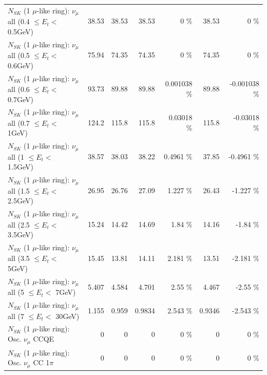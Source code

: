 \begin{table}
\begin{tabular}{| l | r | r | r  r | r  r |}
       $N_{SK}$ (1 $\mu$-like ring): $\nu_{\mu}$ all (0.4 $\leq E_{t} <$ 0.5GeV) &           38.53 &           38.53 &           38.53 &        0 \%  &           38.53 &        0 \%  \\ 
       $N_{SK}$ (1 $\mu$-like ring): $\nu_{\mu}$ all (0.5 $\leq E_{t} <$ 0.6GeV) &           75.94 &           74.35 &           74.35 &        0 \%  &           74.35 &        0 \%  \\ 
       $N_{SK}$ (1 $\mu$-like ring): $\nu_{\mu}$ all (0.6 $\leq E_{t} <$ 0.7GeV) &           93.73 &           89.88 &           89.88 & 0.001038 \%  &           89.88 & -0.001038 \%  \\ 
         $N_{SK}$ (1 $\mu$-like ring): $\nu_{\mu}$ all (0.7 $\leq E_{t} <$ 1GeV) &           124.2 &           115.8 &           115.8 &  0.03018 \%  &           115.8 & -0.03018 \%  \\ 
         $N_{SK}$ (1 $\mu$-like ring): $\nu_{\mu}$ all (1 $\leq E_{t} <$ 1.5GeV) &           38.57 &           38.03 &           38.22 &   0.4961 \%  &           37.85 &  -0.4961 \%  \\ 
       $N_{SK}$ (1 $\mu$-like ring): $\nu_{\mu}$ all (1.5 $\leq E_{t} <$ 2.5GeV) &           26.95 &           26.76 &           27.09 &    1.227 \%  &           26.43 &   -1.227 \%  \\ 
       $N_{SK}$ (1 $\mu$-like ring): $\nu_{\mu}$ all (2.5 $\leq E_{t} <$ 3.5GeV) &           15.24 &           14.42 &           14.69 &     1.84 \%  &           14.16 &    -1.84 \%  \\ 
         $N_{SK}$ (1 $\mu$-like ring): $\nu_{\mu}$ all (3.5 $\leq E_{t} <$ 5GeV) &           15.45 &           13.81 &           14.11 &    2.181 \%  &           13.51 &   -2.181 \%  \\ 
           $N_{SK}$ (1 $\mu$-like ring): $\nu_{\mu}$ all (5 $\leq E_{t} <$ 7GeV) &           5.407 &           4.584 &           4.701 &     2.55 \%  &           4.467 &    -2.55 \%  \\ 
          $N_{SK}$ (1 $\mu$-like ring): $\nu_{\mu}$ all (7 $\leq E_{t} <$ 30GeV) &           1.155 &           0.959 &          0.9834 &    2.543 \%  &          0.9346 &   -2.543 \%  \\ 
\hline
\hline
                               $N_{SK}$ (1 $\mu$-like ring): Osc. $\nu_\mu$ CCQE &               0 &               0 &               0 &        0 \%  &               0 &        0 \%  \\ 
                          $N_{SK}$ (1 $\mu$-like ring): Osc. $\nu_\mu$ CC 1$\pi$ &               0 &               0 &               0 &        0 \%  &               0 &        0 \%  \\ 

\end{tabular}
\end{table}
